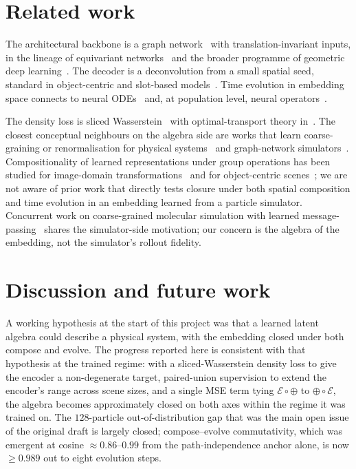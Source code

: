 \documentclass[11pt]{article}
\newcommand{\combine}{\oplus}
\newcommand{\evolve}{\mathcal{E}}
\begin{document}
\section{Related work}
\label{sec:related}

The architectural backbone is a graph network~\cite{battaglia2018graphnets, sanchez2020learning} with translation-invariant inputs, in the lineage of equivariant networks~\cite{cohen2016group, thomas2018tensorfield, satorras2021egnn} and the broader programme of geometric deep learning~\cite{bronstein2021geometric}. The decoder is a deconvolution from a small spatial seed, standard in object-centric and slot-based models~\cite{watters2019cobra, locatello2020slot, greff2020binding}. Time evolution in embedding space connects to neural ODEs~\cite{chen2018neuralode} and, at population level, neural operators~\cite{li2021fno, kovachki2023fno}.

The density loss is sliced Wasserstein~\cite{rabin2011wasserstein, kolouri2019sliced, deshpande2018gswd} with optimal-transport theory in~\cite{villani2008optimal}. The closest conceptual neighbours on the algebra side are works that learn coarse-graining or renormalisation for physical systems~\cite{wilson1971renormalization} and graph-network simulators~\cite{sanchez2020learning}. Compositionality of learned representations under group operations has been studied for image-domain transformations~\cite{cohen2016group} and for object-centric scenes~\cite{locatello2020slot, greff2020binding}; we are not aware of prior work that directly tests closure under both spatial composition and time evolution in an embedding learned from a particle simulator. Concurrent work on coarse-grained molecular simulation with learned message-passing~\cite{sanchez2020learning} shares the simulator-side motivation; our concern is the algebra of the embedding, not the simulator's rollout fidelity.

\section{Discussion and future work}
\label{sec:discussion}

A working hypothesis at the start of this project was that a learned latent algebra could describe a physical system, with the embedding closed under both compose and evolve. The progress reported here is consistent with that hypothesis at the trained regime: with a sliced-Wasserstein density loss to give the encoder a non-degenerate target, paired-union supervision to extend the encoder's range across scene sizes, and a single MSE term tying $\evolve \circ \combine$ to $\combine \circ \evolve$, the algebra becomes approximately closed on both axes within the regime it was trained on. The $128$-particle out-of-distribution gap that was the main open issue of the original draft is largely closed; compose--evolve commutativity, which was emergent at cosine $\approx 0.86$--$0.99$ from the path-independence anchor alone, is now $\ge 0.989$ out to eight evolution steps.
\end{document}

